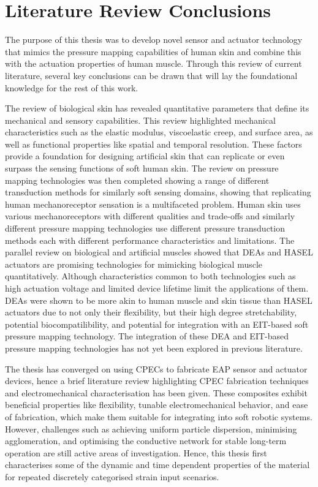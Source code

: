 \newpage
\section{Literature Review Conclusions}
The purpose of this thesis was to develop novel sensor and actuator technology that mimics the pressure mapping capabilities of human skin and combine this with the actuation properties of human muscle. Through this review of current literature, several key conclusions can be drawn that will lay the foundational knowledge for the rest of this work.

The review of biological skin has revealed quantitative parameters that define its mechanical and sensory capabilities. This review highlighted mechanical characteristics such as the elastic modulus, viscoelastic creep, and surface area, as well as functional properties like spatial and temporal resolution. These factors provide a foundation for designing artificial skin that can replicate or even surpass the sensing functions of soft human skin. The review on pressure mapping technologies was then completed showing a range of different transduction methods for similarly soft sensing domains, showing that replicating human mechanoreceptor sensation is a multifaceted problem. Human skin uses various mechanoreceptors with different qualities and trade-offs and similarly different pressure mapping technologies use different pressure transduction methods each with different performance characteristics and limitations. The parallel review on biological and artificial muscles showed that DEAs and HASEL actuators are promising technologies for mimicking biological muscle quantitatively. Although characteristics common to both technologies such as high actuation voltage and limited device lifetime limit the applications of them. DEAs were shown to be more akin to human muscle and skin tissue than HASEL actuators due to not only their flexibility, but their high degree stretchability, potential biocompatilibility, and potential for integration with an EIT-based soft pressure mapping technology. The integration of these DEA and EIT-based pressure mapping technologies  has not yet been explored in previous literature.

The thesis has converged on using CPECs to fabricate EAP sensor and actuator devices, hence a brief literature review highlighting CPEC fabrication techniques and electromechanical characterisation has been given. These composites exhibit beneficial properties like flexibility, tunable electromechanical behavior, and ease of fabrication, which make them suitable for integrating into soft robotic systems. However, challenges such as achieving uniform particle dispersion, minimising agglomeration, and optimising the conductive network for stable long-term operation are still active areas of investigation. Hence, this thesis first characterises some of the dynamic and time dependent properties of the material for repeated discretely categorised strain input scenarios.

